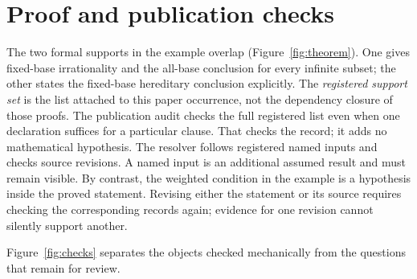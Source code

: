 \documentclass[10pt]{article}
\begin{document}
\section{Proof and publication checks}\label{sec:checks}\label{sec:graph}
The two formal supports in the example overlap (Figure~\ref{fig:theorem}). One gives fixed-base irrationality and the all-base conclusion for every infinite subset; the other states the fixed-base hereditary conclusion explicitly. The \emph{registered support set} is the list attached to this paper occurrence, not the dependency closure of those proofs. The publication audit checks the full registered list even when one declaration suffices for a particular clause. That checks the record; it adds no mathematical hypothesis.
The resolver follows registered named inputs and checks source revisions. A named input is an additional assumed result and must remain visible. By contrast, the weighted condition in the example is a hypothesis inside the proved statement. Revising either the statement or its source requires checking the corresponding records again; evidence for one revision cannot silently support another.

Figure~\ref{fig:checks} separates the objects checked mechanically from the questions that remain for review.
\end{document}

